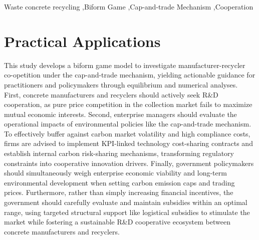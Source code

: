 \documentclass[authoryear,preprint,review,times,10pt]{elsarticle}
\begin{document}
\begin{frontmatter}
\begin{abstract}
\end{abstract}

\begin{keyword}
Waste concrete recycling \sep Biform Game \sep Cap-and-trade Mechanism \sep Cooperation
\end{keyword}

\end{frontmatter}

\section*{Practical Applications}
This study develops a biform game model to investigate manufacturer-recycler co-opetition under the cap-and-trade mechanism, yielding actionable guidance for practitioners and policymakers through equilibrium and numerical analyses. First, concrete manufacturers and recyclers should actively seek R\&D cooperation, as pure price competition in the collection market fails to maximize mutual economic interests. Second, enterprise managers should evaluate the operational impacts of environmental policies like the cap-and-trade mechanism. To effectively buffer against carbon market volatility and high compliance costs, firms are advised to implement KPI-linked technology cost-sharing contracts and establish internal carbon risk-sharing mechanisms, transforming regulatory constraints into cooperative innovation drivers. Finally, government policymakers should simultaneously weigh enterprise economic viability and long-term environmental development when setting carbon emission caps and trading prices. Furthermore, rather than simply increasing financial incentives, the government should carefully evaluate and maintain subsidies within an optimal range, using targeted structural support like logistical subsidies to stimulate the market while fostering a sustainable R\&D cooperative ecosystem between concrete manufacturers and recyclers.
\end{document}
